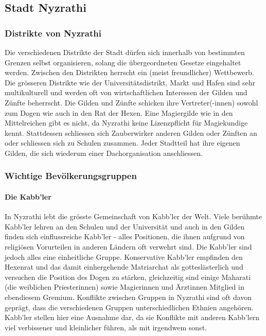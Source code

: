 \documentclass[10pt,twoside,twocolumn,openany]{book}
\begin{document}
\subsection{Stadt Nyzrathi}
\subsubsection{Distrikte von Nyzrathi} Die verschiedenen Distrikte der Stadt dürfen sich innerhalb von bestimmten Grenzen selbst organisieren, solang die übergeordneten Gesetze eingehaltet werden. Zwischen den Distrikten herrscht ein (meist freundlicher) Wettbewerb. Die grösseren Distrikte wie der Universitätsdistrikt, Markt und Hafen sind sehr multikulturell und werden oft von wirtschaftlichen Interessen der Gilden und Zünfte beherrscht. Die Gilden und Zünfte schicken ihre Vertreter(-innen) sowohl zum Dogen wie auch in den Rat der Hexen. Eine Magiergilde wie in den Mittelreichen gibt es nicht, da Nyzrathi keine Lizenzpflicht für Magiekundige kennt. Stattdessen schliessen sich Zauberwirker anderen Gilden oder Zünften an oder schliessen sich zu Schulen zusammen. Jeder Stadtteil hat ihre eigenen Gilden, die sich wiederum einer Dachorganisation anschliessen.

\subsubsection{Wichtige Bevölkerungsgruppen}
\paragraph{Die Kabb'ler} In Nyzrathi lebt die grösste Gemeinschaft von Kabb'ler der Welt. Viele berühmte Kabb'ler lehren an den Schulen und der Universität und auch in den Gilden finden sich einflussreiche Kabb'ler - alles Positionen, die ihnen aufgrund von religiösen Vorurteilen in anderen Ländern oft verwehrt sind. Die Kabb'ler sind jedoch alles eine einheitliche Gruppe. Konservative Kabb'ler empfinden den Hexenrat und das damit einhergehende Matriarchat als gotteslästerlich und versuchen die Position des Dogen zu stärken, gleichzeitig sind einige Maharati (die weiblichen Priesterinnen) sowie Magierinnen und Ärztinnen  Mitglied in ebendiesem Gremium. Konflikte zwischen Gruppen in Nyzrathi sind oft davon geprägt, dass die verschiedenen Gruppen unterschiedlichen Ethnien angehören. Kabb'ler stellen hier eine Ausnahme dar, da sie Konflikte mit anderen Kabb'lern viel verbissener und kleinlicher führen, als mit irgendwem sonst.
\end{document}
